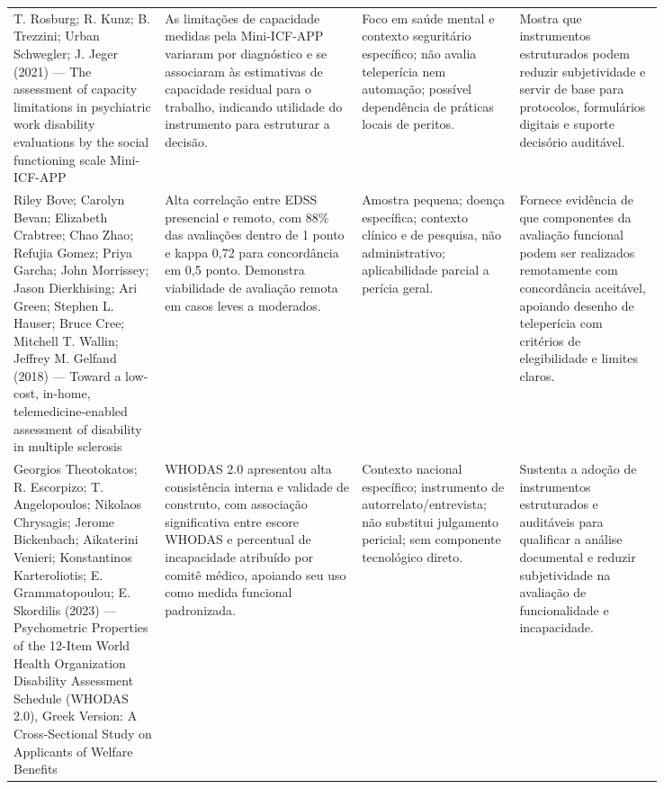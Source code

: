 \documentclass[12pt,a4paper]{article}
\begin{document}
\begin{landscape}
\begin{longtable}{p{0.20\linewidth}p{0.26\linewidth}p{0.19\linewidth}p{0.19\linewidth}}
T. Rosburg; R. Kunz; B. Trezzini; Urban Schwegler; J. Jeger (2021) — The assessment of capacity limitations in psychiatric work disability evaluations by the social functioning scale Mini-ICF-APP & As limitações de capacidade medidas pela Mini-ICF-APP variaram por diagnóstico e se associaram às estimativas de capacidade residual para o trabalho, indicando utilidade do instrumento para estruturar a decisão. & Foco em saúde mental e contexto seguritário específico; não avalia teleperícia nem automação; possível dependência de práticas locais de peritos. & Mostra que instrumentos estruturados podem reduzir subjetividade e servir de base para protocolos, formulários digitais e suporte decisório auditável.\\
Riley Bove; Carolyn Bevan; Elizabeth Crabtree; Chao Zhao; Refujia Gomez; Priya Garcha; John Morrissey; Jason Dierkhising; Ari Green; Stephen L. Hauser; Bruce Cree; Mitchell T. Wallin; Jeffrey M. Gelfand (2018) — Toward a low-cost, in-home, telemedicine-enabled assessment of disability in multiple sclerosis & Alta correlação entre EDSS presencial e remoto, com 88\% das avaliações dentro de 1 ponto e kappa 0,72 para concordância em 0,5 ponto. Demonstra viabilidade de avaliação remota em casos leves a moderados. & Amostra pequena; doença específica; contexto clínico e de pesquisa, não administrativo; aplicabilidade parcial a perícia geral. & Fornece evidência de que componentes da avaliação funcional podem ser realizados remotamente com concordância aceitável, apoiando desenho de teleperícia com critérios de elegibilidade e limites claros.\\
Georgios Theotokatos; R. Escorpizo; T. Angelopoulos; Nikolaos Chrysagis; Jerome Bickenbach; Aikaterini Venieri; Konstantinos Karteroliotis; E. Grammatopoulou; E. Skordilis (2023) — Psychometric Properties of the 12-Item World Health Organization Disability Assessment Schedule (WHODAS 2.0), Greek Version: A Cross-Sectional Study on Applicants of Welfare Benefits & WHODAS 2.0 apresentou alta consistência interna e validade de construto, com associação significativa entre escore WHODAS e percentual de incapacidade atribuído por comitê médico, apoiando seu uso como medida funcional padronizada. & Contexto nacional específico; instrumento de autorrelato/entrevista; não substitui julgamento pericial; sem componente tecnológico direto. & Sustenta a adoção de instrumentos estruturados e auditáveis para qualificar a análise documental e reduzir subjetividade na avaliação de funcionalidade e incapacidade.\\

\end{longtable}
\end{landscape}
\end{document}
